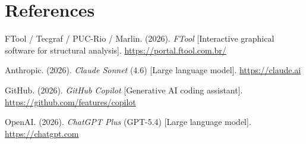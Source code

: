\chapter{References}

FTool / Tecgraf / PUC-Rio / Marlin. (2026). \textit{FTool} [Interactive graphical software for structural analysis]. \url{https://portal.ftool.com.br/}

Anthropic. (2026). \textit{Claude Sonnet} (4.6) [Large language model]. \url{https://claude.ai}

GitHub. (2026). \textit{GitHub Copilot} [Generative AI coding assistant]. \url{https://github.com/features/copilot}

OpenAI. (2026). \textit{ChatGPT Plus} (GPT-5.4) [Large language model]. \url{https://chatgpt.com}
